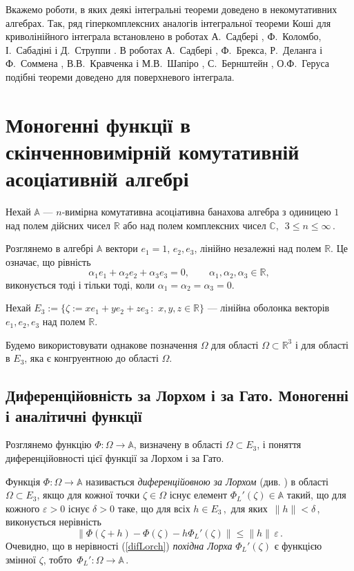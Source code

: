 \documentclass[11pt, reqno]{amsart}
\begin{document}
Вкажемо роботи, в яких деякі інтегральні теореми доведено в некомутативних алгебрах.
Так, ряд гіперкомплексних аналогів інтегральної теореми Коші для криволінійного інтеграла
встановлено в роботах А.~Садбері \cite{Sudbery},  Ф.~Коломбо, І.~Сабадіні і Д.~Струппи \cite{Colombo}.
В роботах А.~Садбері \cite{Sudbery}, Ф.~Брекса, Р.~Деланга і Ф.~Соммена
\cite{Brakx}, В.В.~Кравченка і М.В.~Шапіро
\cite{Krav-Shap}, С.~Бернштейн \cite{Bernstein}, О.Ф.~Геруса \cite{Gerus-2011}
подібні теореми доведено для поверхневого інтеграла.


\vskip 1mm


\section{Моногенні функції в скінченновимірній комутативній асоціативній алгебрі}

Нехай $\mathbb A$ --- $n$-вимірна комутативна асоціативна банахова
алгебра з одиницею $1$ над полем дійсних чисел $\mathbb R$ або над
полем комплексних чисел $\mathbb C$,\,\, $3\le n\le\infty$\,.

Розглянемо в алгебрі $\mathbb{A}$ вектори $e_1=1$, $e_2, e_3$,
лінійно незалежні над полем $\mathbb{R}$. Це означає, що рівність
$$\alpha_1e_1+\alpha_2e_2+\alpha_3e_3=0,\qquad \alpha_1,\alpha_2,
\alpha_3\in\mathbb{R},$$
виконується тоді і тільки тоді, коли $\alpha_1=\alpha_2=
\alpha_3=0$.

Нехай $E_3:=\{\zeta :=xe_1+ye_2+ze_3\,: \,\,x,y,z\in\mathbb R\}$ ---
лінійна оболонка векторів $e_1,e_2,e_3$ над полем $\mathbb R$.

Будемо використовувати однакове позначення $\Omega$ для області
$\Omega\subset{\mathbb R}^3$ і для області в $E_3$, яка є
конгруентною  до області $\Omega$.


\subsection{Диференційовність за Лорхом і за Гато. Моногенні і аналітичні функції}


Розглянемо функцію $\Phi \colon \Omega\rightarrow\mathbb{A}$,
визначену в області $\Omega\subset E_3$, і поняття
диференційовності цієї функції за Лорхом і за Гато.


Функція $\Phi \colon \Omega \rightarrow \mathbb{A}$
називається {\em диференційовною за Лорхом} (див. \cite{Lorch}) в
області $\Omega\subset E_3$, якщо для кожної точки
$\zeta\in\Omega$ існує елемент $\Phi_L'(\zeta)\in\mathbb{A}$
такий, що для кожного $\varepsilon>0$ існує $\delta>0$ таке, що
для всіх $h\in E_3$\,,\, для яких\, $\|h\| <\delta$\,, виконується
нерівність
\begin{equation}\label{difLorch}
\left\|\Phi(\zeta+h)-\Phi(\zeta)-h\Phi_L'(\zeta)\right\|\leq\|h\|\,\varepsilon\,.
\end{equation}
Очевидно, що в нерівності (\ref{difLorch})
 {\em похідна Лорха} $\Phi_L'(\zeta)$ є функцією
змінної $\zeta$, тобто\, $\Phi_L' \colon
\Omega\rightarrow\mathbb{A}$\,.
\end{document}
